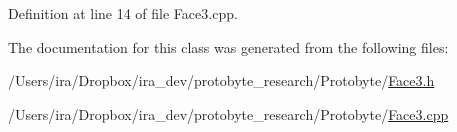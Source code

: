 Definition at line 14 of file Face3.\-cpp.



The documentation for this class was generated from the following files\-:\begin{DoxyCompactItemize}
\item 
/\-Users/ira/\-Dropbox/ira\-\_\-dev/protobyte\-\_\-research/\-Protobyte/\hyperlink{_face3_8h}{Face3.\-h}\item 
/\-Users/ira/\-Dropbox/ira\-\_\-dev/protobyte\-\_\-research/\-Protobyte/\hyperlink{_face3_8cpp}{Face3.\-cpp}\end{DoxyCompactItemize}
